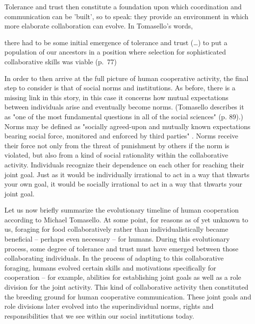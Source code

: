 Tolerance and trust then constitute a foundation upon which coordination and communication can be 'built', so to speak: they provide an environment in which more elaborate collaboration can evolve. In Tomasello's words,
\begin{quoting}
    there had to be some initial emergence of tolerance and trust (\ldots) to put a population of our ancestors in a position where selection for sophisticated collaborative skills was viable
    \hfill (p.~77)
\end{quoting}

In order to then arrive at the full picture of human cooperative activity, the final step to consider is that of social norms and institutions. As before, there is a missing link in this story, in this case it concerns how mutual expectations between individuals arise and eventually become norms. (Tomasello describes it as "one of the most fundamental questions in all of the social sciences" (p. 89).)
Norms may be defined as "socially agreed-upon and mutually known expectations bearing social force, monitored and enforced by third parties" \citep[p.~87]{Tomasello09}. Norms receive their force not only from the threat of punishment by others if the norm is violated, but also from a kind of social rationality within the collaborative activity. Individuals recognize their dependence on each other for reaching their joint goal. Just as it would be individually irrational to act in a way that thwarts your own goal, it would be socially irrational to act in a way that thwarts your joint goal.

Let us now briefly summarize the evolutionary timeline of human cooperation according to Michael Tomasello.
At some point, for reasons as of yet unknown to us, foraging for food collaboratively rather than individualistically became beneficial -- perhaps even necessary -- for humans.
During this evolutionary process, some degree of tolerance and trust must have emerged between those collaborating individuals.
In the process of adapting to this collaborative foraging, humans evolved certain skills and motivations specifically for cooperation -- for example, abilities for establishing joint goals as well as a role division for the joint activity.
This kind of collaborative activity then constituted the breeding ground for human cooperative communication.
These joint goals and role divisions later evolved into the superindividual norms, rights and responsibilities that we see within our social institutions today.

